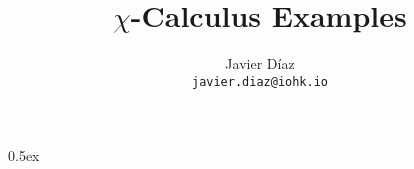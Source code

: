 \documentclass[a4paper,11pt]{article}
\begin{document}
\title{$\chi$-Calculus Examples}
\author{Javier D\'iaz\\\small\texttt{javier.diaz@iohk.io}}

\maketitle

\tableofcontents

\parindent 0pt\parskip 0.5ex


\end{document}
